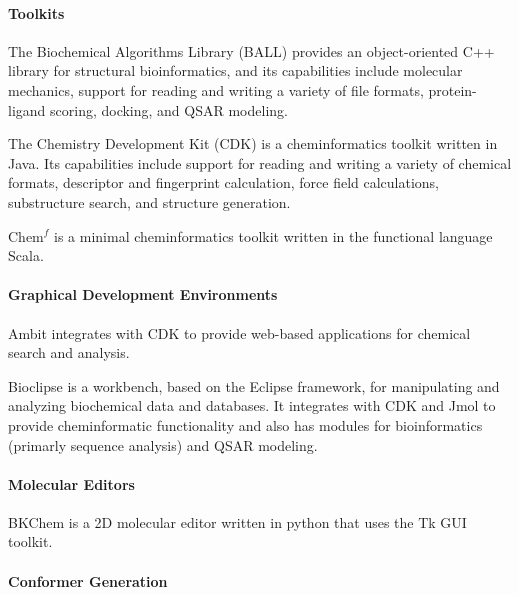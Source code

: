 \paragraph{Toolkits}
The Biochemical Algorithms Library (BALL) \cite{Hildebrandt_2010} provides an object-oriented C++ library for structural bioinformatics, and its capabilities include molecular mechanics, support for reading and writing a variety of file formats, protein-ligand scoring, docking, and QSAR modeling.

The Chemistry Development Kit (CDK) \cite{Steinbeck_2006} is a cheminformatics toolkit written in Java.  Its capabilities include support for reading and writing a variety of chemical formats, descriptor and fingerprint calculation, force field calculations, substructure search, and structure generation.

Chem$^f$ \cite{H_ck_2012} is a minimal cheminformatics toolkit written in the functional language Scala.

\paragraph{Graphical Development Environments}

Ambit \cite{Jeliazkova_2011} integrates with CDK to provide web-based applications for chemical search and analysis.

Bioclipse  \cite{Spjuth_2009} is a workbench, based on the Eclipse framework, for manipulating and analyzing biochemical data and databases. It integrates with CDK and Jmol to provide cheminformatic functionality and also has modules for bioinformatics (primarly sequence analysis) and QSAR modeling.

\paragraph{Molecular Editors}

BKChem is a 2D molecular editor written in python that uses the Tk GUI toolkit.


\paragraph{Conformer Generation}

